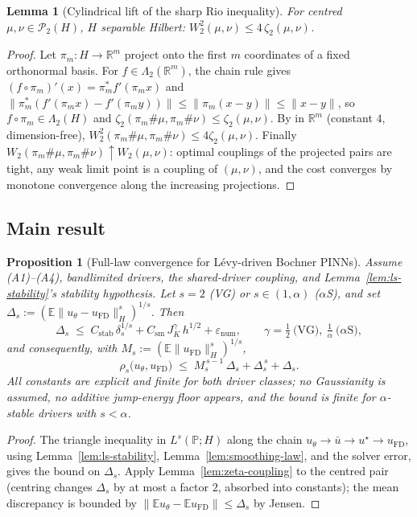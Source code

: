 \documentclass[review,12pt]{elsarticle}
\newtheorem{proposition}{Proposition}
\newtheorem{lemma}{Lemma}
\begin{document}
\begin{lemma}[Cylindrical lift of the sharp Rio inequality]
\label{lem:bb-lift}
For centred $\mu, \nu \in \mathcal P_2(H)$, $H$ separable Hilbert:
$W_2^2(\mu,\nu) \le 4\,\zeta_2(\mu,\nu)$.
\end{lemma}

\begin{proof}
Let $\pi_m : H \to \mathbb R^m$ project onto the first $m$
coordinates of a fixed orthonormal basis. For
$f \in \Lambda_2(\mathbb R^m)$, the chain rule gives
$(f \circ \pi_m)'(x) = \pi_m^* f'(\pi_m x)$ and
$\|\pi_m^*(f'(\pi_m x) - f'(\pi_m y))\| \le \|\pi_m(x-y)\| \le
\|x - y\|$, so $f \circ \pi_m \in \Lambda_2(H)$ and
$\zeta_2(\pi_m\#\mu, \pi_m\#\nu) \le \zeta_2(\mu,\nu)$. By
\cite[Thm.~3.1]{BolbotowskiBouchitte2025} in $\mathbb R^m$ (constant
$4$, dimension-free),
$W_2^2(\pi_m\#\mu, \pi_m\#\nu) \le 4\zeta_2(\mu,\nu)$. Finally
$W_2(\pi_m\#\mu, \pi_m\#\nu) \uparrow W_2(\mu,\nu)$: optimal
couplings of the projected pairs are tight, any weak limit point is a
coupling of $(\mu,\nu)$, and the cost converges by monotone
convergence along the increasing projections.
\end{proof}

\subsection{Main result}

\begin{proposition}[Full-law convergence for L\'evy-driven Bochner
PINNs]\label{prop:zeta-main}
Assume (A1)--(A4), bandlimited drivers, the shared-driver coupling,
and Lemma~\ref{lem:ls-stability}'s stability hypothesis. Let $s = 2$
(VG) or $s \in (1, \alpha)$ ($\alpha$S), and set
$\Delta_s := (\mathbb E\|u_\theta - u_{\mathrm{FD}}\|_H^s)^{1/s}$.
Then
\[
\Delta_s \;\le\; C_{\mathrm{stab}}\,\delta_s^{1/s}
+ C_{\mathrm{sm}}\, J_K^{\gamma}\, h^{1/2}
+ \varepsilon_{\mathrm{num}},
\qquad \gamma = \tfrac12\ \text{(VG)},\ \tfrac1\alpha\ \text{($\alpha$S)},
\]
and consequently, with
$M_s := (\mathbb E\|u_{\mathrm{FD}}\|_H^s)^{1/s}$,
\[
\rho_s\bigl(u_\theta, u_{\mathrm{FD}}\bigr) \;\le\;
M_s^{\,s-1}\,\Delta_s + \Delta_s^{\,s} + \Delta_s.
\]
All constants are explicit and finite for both driver classes; no
Gaussianity is assumed, no additive jump-energy floor appears, and
the bound is finite for $\alpha$-stable drivers with
$s < \alpha$.
\end{proposition}

\begin{proof}
The triangle inequality in $L^s(\mathbb P; H)$ along the chain
$u_\theta \to \bar u \to u^\star \to u_{\mathrm{FD}}$, using
Lemma~\ref{lem:ls-stability}, Lemma~\ref{lem:smoothing-law}, and the
solver error, gives the bound on $\Delta_s$. Apply
Lemma~\ref{lem:zeta-coupling} to the centred pair (centring changes
$\Delta_s$ by at most a factor $2$, absorbed into constants); the
mean discrepancy is bounded by
$\|\mathbb E u_\theta - \mathbb E u_{\mathrm{FD}}\| \le \Delta_s$ by
Jensen.
\end{proof}
\end{document}
